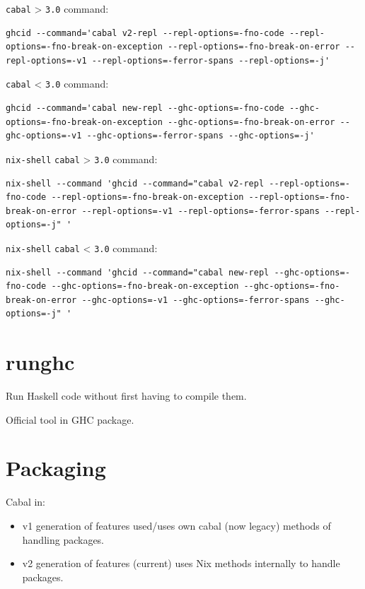 \documentclass[a4paper,14pt,oneside]{book}
\begin{document}
\texttt{cabal} > \texttt{3.0} command:
\begin{verbatim}
ghcid --command='cabal v2-repl --repl-options=-fno-code --repl-options=-fno-break-on-exception --repl-options=-fno-break-on-error --repl-options=-v1 --repl-options=-ferror-spans --repl-options=-j'
\end{verbatim}

\texttt{cabal} < \texttt{3.0} command:
\begin{verbatim}
ghcid --command='cabal new-repl --ghc-options=-fno-code --ghc-options=-fno-break-on-exception --ghc-options=-fno-break-on-error --ghc-options=-v1 --ghc-options=-ferror-spans --ghc-options=-j'
\end{verbatim}

\texttt{nix-shell} \texttt{cabal} > \texttt{3.0} command:
\begin{verbatim}
nix-shell --command 'ghcid --command="cabal v2-repl --repl-options=-fno-code --repl-options=-fno-break-on-exception --repl-options=-fno-break-on-error --repl-options=-v1 --repl-options=-ferror-spans --repl-options=-j" '
\end{verbatim}

\texttt{nix-shell} \texttt{cabal} < \texttt{3.0} command:
\begin{verbatim}
nix-shell --command 'ghcid --command="cabal new-repl --ghc-options=-fno-code --ghc-options=-fno-break-on-exception --ghc-options=-fno-break-on-error --ghc-options=-v1 --ghc-options=-ferror-spans --ghc-options=-j" '

\end{verbatim}

\chapter{runghc}
\label{sec:orga448f8c}

Run Haskell code without first having to compile them.

Official tool in GHC package.

\chapter{Packaging}
\label{sec:org54628c1}

Cabal in:
\begin{itemize}
\item v1 generation of features used/uses own cabal (now legacy) methods of handling packages.
\item v2 generation of features (current) uses Nix methods internally to handle packages.
\end{itemize}
\end{document}
